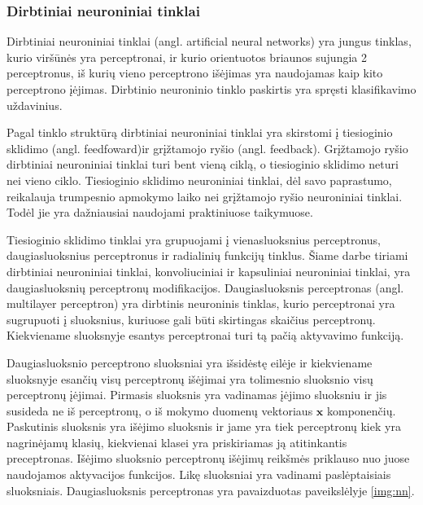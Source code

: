 \subsubsection{Dirbtiniai neuroniniai tinklai}

Dirbtiniai neuroniniai tinklai (angl. artificial neural networks) yra jungus tinklas, kurio viršūnės yra perceptronai, ir kurio orientuotos briaunos sujungia 2 perceptronus, iš kurių vieno perceptrono išėjimas yra naudojamas kaip kito perceptrono įėjimas. Dirbtinio neuroninio tinklo paskirtis yra spręsti klasifikavimo uždavinius.

Pagal tinklo struktūrą dirbtiniai neuroniniai tinklai yra skirstomi į tiesioginio sklidimo (angl. feedfoward)ir grįžtamojo ryšio (angl. feedback). Grįžtamojo ryšio dirbtiniai neuroniniai tinklai turi bent vieną ciklą, o tiesioginio sklidimo neturi nei vieno ciklo. Tiesioginio sklidimo neuroniniai tinklai, dėl savo paprastumo, reikalauja trumpesnio apmokymo laiko nei grįžtamojo ryšio neuroniniai tinklai. Todėl jie yra dažniausiai naudojami praktiniuose taikymuose.

Tiesioginio sklidimo tinklai yra grupuojami į vienasluoksnius perceptronus, daugiasluoksnius perceptronus ir radialinių funkcijų tinklus. Šiame darbe tiriami dirbtiniai neuroniniai tinklai, konvoliuciniai ir kapsuliniai neuroniniai tinklai, yra daugiasluoksnių perceptronų modifikacijos. Daugiasluoksnis perceptronas (angl. multilayer perceptron) yra dirbtinis neuroninis tinklas, kurio perceptronai yra sugrupuoti į sluoksnius, kuriuose gali būti skirtingas skaičius perceptronų. Kiekviename sluoksnyje esantys perceptronai turi tą pačią aktyvavimo funkciją.

Daugiasluoksnio perceptrono sluoksniai yra išsidėstę eilėje ir kiekviename sluoksnyje esančių visų perceptronų išėjimai yra tolimesnio sluoksnio visų perceptronų įėjimai. Pirmasis sluoksnis  yra vadinamas įėjimo sluoksniu ir jis susideda ne iš perceptronų, o iš mokymo duomenų vektoriaus $\boldsymbol{x}$ komponenčių. Paskutinis sluoksnis yra išėjimo sluoksnis ir jame yra tiek perceptronų kiek yra nagrinėjamų klasių, kiekvienai klasei yra priskiriamas ją atitinkantis preceptronas. Išėjimo sluoksnio perceptronų išėjimų reikšmės priklauso nuo juose naudojamos aktyvacijos funkcijos. Likę sluoksniai yra vadinami paslėptaisiais sluoksniais. Daugiasluoksnis perceptronas yra pavaizduotas paveikslėlyje \ref{img:nn}.

